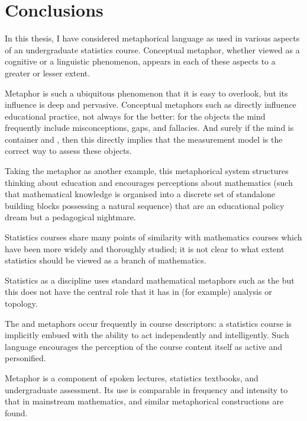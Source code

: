 \chapter{Conclusions}
\label{chapter8}

In this thesis, I have considered metaphorical language as used in
various aspects of an undergraduate statistics course.  Conceptual
metaphor, whether viewed as a cognitive or a linguistic phenomenon,
appears in each of these aspects to a greater or lesser extent.

Metaphor is such a ubiquitous phenomenon that it is easy to overlook,
but its influence is deep and pervasive.  Conceptual metaphors such as
 directly influence educational
practice, not always for the better: for the objects  the
mind frequently include misconceptions, gaps, and fallacies.  And
surely if the mind is container and ,
then this directly implies that the measurement model is the correct
way to assess these objects.

Taking the  metaphor as another example, this
metaphorical system structures thinking about education and encourages
perceptions about mathematics (such that mathematical knowledge is
organised into a discrete set of standalone building blocks possessing
a natural sequence) that are an educational policy dream but a
pedagogical nightmare.

Statistics courses share many points of similarity with mathematics
courses which have been more widely and thoroughly studied; it is not
clear to what extent statistics should be viewed as a branch of
mathematics.

Statistics as a discipline uses standard mathematical metaphors such
as the  but this does not have the
central role that it has in (for example) analysis or topology.  

The  and  metaphors occur
frequently in course descriptors: a statistics course is implicitly
embued with the ability to act independently and intelligently.  Such
language encourages the perception of the course content itself as
active and personified. 

Metaphor is a component of spoken lectures, statistics textbooks, and
undergraduate assessment.  Its use is comparable in frequency and
intensity to that in mainstream mathematics, and similar metaphorical
constructions are found.


